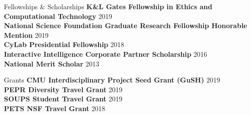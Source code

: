 \documentclass{resume} %
\begin{document}
\begin{rSection}{Fellowships \& Scholarships}
	{\bf K\&L Gates Fellowship in Ethics and Computational Technology} \hfill 2019 \\ 
	{\bf National Science Foundation Graduate Research Fellowship Honorable Mention} \hfill 2019 \\ 
	{\bf CyLab Presidential Fellowship} \hfill 2018 \\ 
	{\bf Interactive Intelligence Corporate Partner Scholarship} \hfill 2016 \\ 
	{\bf National Merit Scholar} \hfill 2013 \\ 

\end{rSection}

\begin{rSection}{Grants}
	{\bf CMU Interdisciplinary Project Seed Grant (GuSH)} \hfill 2019 \\ 
	{\bf PEPR Diversity Travel Grant} \hfill 2019 \\ 
	{\bf SOUPS Student Travel Grant} \hfill 2019 \\ 
	{\bf PETS NSF Travel Grant} \hfill 2018 \\ 
\end{rSection}
	
\end{document}
